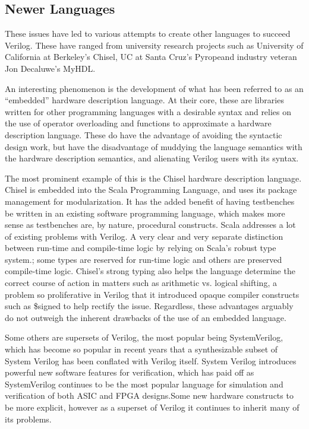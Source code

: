 \documentclass[10pt, two column]{article}
\theoremstyle{definition}
\begin{document}
\subsection{Newer Languages}
These issues have led to various attempts to create other languages to succeed Verilog. These have ranged from university research projects such as University of California at Berkeley’s Chisel\cite{Chisel_2012}, UC at Santa Cruz’s Pyrope\cite{Pyrope}and industry veteran Jon Decaluwe’s MyHDL\cite{MyHDLmanual_2018}.\newline 

An interesting phenomenon is the development of what has been referred to as an “embedded” hardware description language. At their core, these are libraries written for other programming languages with a desirable syntax and relies on the use of operator overloading and functions to approximate a hardware description language. These do have the advantage of avoiding the syntactic design work, but have the disadvantage of muddying the language semantics with the hardware description semantics, and alienating Verilog users with its syntax.\newline 

The most prominent example of this is the Chisel hardware description language. Chisel is embedded into the Scala Programming Language\cite{scalaOverview2004}, and uses its package management for modularization.  It has the added benefit of having testbenches be written in an existing software programming language, which makes more sense as testbenches are, by nature, procedural constructs. Scala addresses a lot of existing problems with Verilog.  A very clear and very separate distinction between run-time and compile-time logic by relying on Scala’s robust type system.; some types are reserved for run-time logic and others are preserved compile-time logic. Chisel’s strong typing also helps the language determine the correct course of action in matters such as arithmetic vs. logical shifting, a problem so proliferative in Verilog that it introduced opaque compiler constructs such as \$signed to help rectify the issue. Regardless, these advantages arguably do not outweigh the inherent drawbacks of the use of an embedded language.\cite{Chisel_2012}\newline

Some others are supersets of Verilog, the most popular being SystemVerilog, which has become so popular in recent years that a synthesizable subset of System Verilog has been conflated with Verilog itself. System Verilog introduces powerful new software features for verification, which has paid off as SystemVerilog continues to be the most popular language for simulation and verification of both ASIC and FPGA designs\cite{foster_2016}.Some new hardware constructs to be more explicit, however as a superset of Verilog it continues to inherit many of its problems.\cite{IEEEstandardforVerilog_UHD_S_VL_2005}\newline
\end{document}

